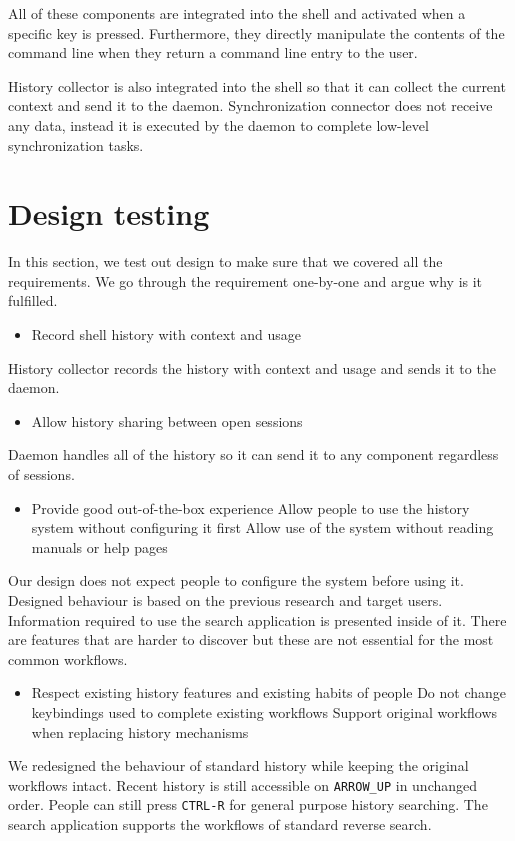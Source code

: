 \documentclass[thesis=M,english]{FITthesis}[2012/10/20]
\begin{document}
All of these components are integrated into the shell and activated when a specific key is pressed. Furthermore, they directly manipulate the contents of the command line when they return a command line entry to the user.

History collector is also integrated into the shell so that it can collect the current context and send it to the daemon. Synchronization connector does not receive any data, instead it is executed by the daemon to complete low-level synchronization tasks. 

\section{Design testing}

In this section, we test out design to make sure that we covered all the requirements. We go through the requirement one-by-one and argue why is it fulfilled. 
\begin{itemize}
    \item Record shell history with context and usage
\end{itemize}
History collector records the history with context and usage and sends it to the daemon.

\begin{itemize}
    \item Allow history sharing between open sessions
\end{itemize}
Daemon handles all of the history so it can send it to any component regardless of sessions.

\begin{itemize}
    \item Provide good out-of-the-box experience 
    \subitem Allow people to use the history system without configuring it first
    \subitem Allow use of the system without reading manuals or help pages
\end{itemize}
Our design does not expect people to configure the system before using it. Designed behaviour is based on the previous research and target users. Information required to use the search application is presented inside of it. There are features that are harder to discover but these are not essential for the most common workflows. 
    
\begin{itemize}
    \item Respect existing history features and existing habits of people
    \subitem Do not change keybindings used to complete existing workflows
    \subitem Support original workflows when replacing history mechanisms
\end{itemize}
We redesigned the behaviour of standard history while keeping the original workflows intact. Recent history is still accessible on \verb|ARROW_UP| in unchanged order. People can still press \verb|CTRL-R| for general purpose history searching. 
The search application supports the workflows of standard reverse search.
    
\end{document}
